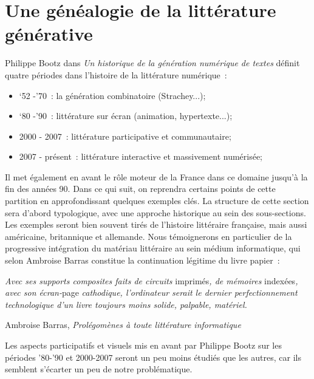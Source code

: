 \documentclass{article}
\newenvironment{citationbox}
{\begin{center}
		\begin{minipage}{.8\textwidth}
		}
		{
		\end{minipage}	
\end{center}
}
\begin{document}
	\section{Une généalogie de la littérature générative}\label{genealogie}
		Philippe Bootz dans \textit{Un historique de la génération numérique de textes} \cite{bootz} définit quatre périodes dans l'histoire de la littérature numérique :
		\vspace{2mm}
		\begin{itemize}
			\item ‘52 -'70 : la génération combinatoire (Strachey...);
			\item ‘80 -'90 : littérature sur écran (animation, hypertexte...);
			\item 2000 - 2007 : littérature participative et communautaire;
			\item 2007 - présent : littérature interactive et massivement numérisée;
		\end{itemize}
		\vspace{2mm}
		Il met également en avant le rôle moteur de la France dans ce domaine jusqu'à la fin des années 90. Dans ce qui suit, on reprendra certains points de cette partition en approfondissant quelques exemples clés. La structure de cette section sera d'abord typologique, avec une approche historique au sein des sous-sections. Les exemples seront  bien souvent tirés de l'histoire littéraire française, mais aussi américaine, britannique et allemande. Nous témoignerons en particulier de la progressive intégration du matériau littéraire au sein médium informatique, qui selon Ambroise Barras constitue la continuation légitime du livre papier~:
		\begin{citationbox}
			\textit{Avec ses
			supports composites faits de circuits} imprimés\textit{, de mémoires }indexées\textit{,
			avec son écran-}page \textit{cathodique, l'ordinateur serait le dernier
			perfectionnement technologique d'un livre toujours moins solide, palpable,
			matériel.}
			\begin{flushright}
				Ambroise Barras, \textit{Prolégomènes à toute littérature informatique} \cite{barras1995}
			\end{flushright}
		\end{citationbox}
		
		 Les aspects participatifs et visuels mis en avant par Philippe Bootz sur les périodes '80-'90 et 2000-2007 seront un peu moins étudiés que les autres, car ils semblent s'écarter un peu de notre problématique.
\end{document}
